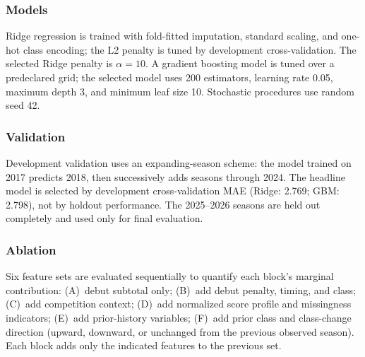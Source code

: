 \subsubsection*{Models} Ridge regression is trained with fold-fitted imputation,
standard scaling, and one-hot class encoding; the L2 penalty is tuned by
development cross-validation. The selected Ridge penalty is $\alpha=10$.
A gradient boosting model is tuned over a predeclared grid; the selected model
uses 200 estimators, learning rate 0.05, maximum depth 3, and minimum leaf size
10. Stochastic procedures use random seed 42.

\subsubsection*{Validation} Development validation uses an expanding-season
scheme: the model trained on 2017 predicts 2018, then successively adds
seasons through 2024. The headline model is selected by development
cross-validation MAE (Ridge: 2.769; GBM: 2.798), not by holdout performance.
The 2025--2026 seasons are held out completely and used only for final
evaluation.

\subsubsection*{Ablation} Six feature sets are evaluated sequentially to quantify
each block's marginal contribution: (A)~debut subtotal only; (B)~add debut
penalty, timing, and class; (C)~add competition context; (D)~add normalized
score profile and missingness indicators; (E)~add prior-history variables;
(F)~add prior class and class-change direction (upward, downward, or unchanged
from the previous observed season). Each block adds only the indicated features
to the previous set.
